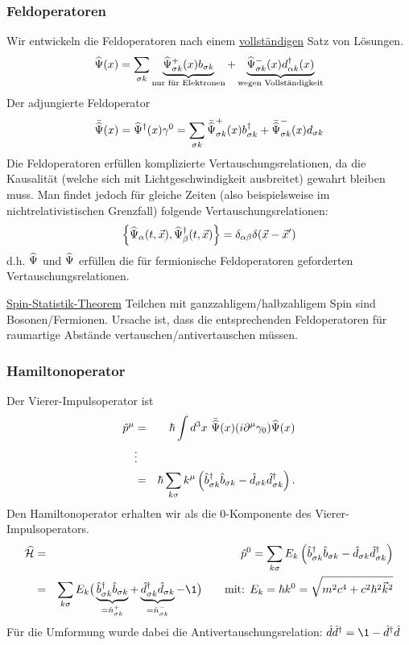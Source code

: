 \subsubsection{Feldoperatoren}
Wir entwickeln die Feldoperatoren nach einem \underline{vollständigen} Satz von Lösungen.
\begin{eqnarray*}
\widehat\Psi(x) = \sum_{\sigma k } \underbrace{\widehat\Psi^+_{\sigma k}(x)b_{\sigma k}}_{\text{nur für Elektronen}} + \underbrace{\widehat\Psi^-_{\sigma k}(x) d_{\alpha k }^\dagger(x) }_{\text{wegen Vollständigkeit}}
\end{eqnarray*}
Der adjungierte Feldoperator
\begin{eqnarray*}
\bar{\widehat\Psi}(x) = \widehat\Psi^\dagger(x) \gamma^0 = \sum_{\sigma k}\bar{\widehat\Psi}^+_{\sigma k}(x) b_{\sigma k}^\dagger + \bar{\widehat\Psi}_{\sigma k}^-(x) d_{\sigma k}
\end{eqnarray*}
Die Feldoperatoren erfüllen komplizierte Vertauschungsrelationen, da die Kausalität (welche sich mit Lichtgeschwindigkeit ausbreitet) gewahrt bleiben muss. Man findet jedoch für gleiche Zeiten (also beispielsweise im nichtrelativistischen Grenzfall) folgende Vertauschungsrelationen: 
\begin{eqnarray*}
\left\{\widehat\Psi_\alpha(t,\vec x), \widehat\Psi_\beta^\dagger(t,\vec x)\right\} = \delta_{\alpha\beta}\delta(\vec x-\vec x')
\end{eqnarray*}
d.h. $\widehat\Psi$ und $\widehat\Psi$ erfüllen die für fermionische Feldoperatoren geforderten Vertauschungsrelationen.

\underline{Spin-Statistik-Theorem} 
Teilchen mit ganzzahligem/halbzahligem Spin sind Bosonen/Fermionen. Ursache ist, dass die entsprechenden Feldoperatoren für raumartige Abstände vertauschen/antivertauschen müssen.

\subsubsection{Hamiltonoperator}
Der Vierer-Impulsoperator ist
\begin{eqnarray*}
\hat p^\mu &=& \hbar \int d^3x \ \bar{\widehat\Psi}(x) (i\partial^\mu \gamma_0) \widehat\Psi(x)\\
&\vdots&\\
&=& \hbar\sum_{ k \sigma} k^\mu \left( \hat b^\dagger_{\sigma k }\hat b_{\sigma k} - \hat d_{\sigma k}\hat d^\dagger _{\sigma k}\right ).
\end{eqnarray*}
Den Hamiltonoperator erhalten wir als die 0-Komponente des Vierer-Impulsoperators. 
\begin{eqnarray*}
\wh\ham &=& \hat p^0 = \sum_{k \sigma} E_{k}\left(\hat b^\dagger_{\sigma k} \hat b_{\sigma k} - \hat d_{\sigma k}\hat d^\dagger _{\sigma k}\ri)
\\
&=& \sum_{k\sigma} E_{k}\big(\underbrace{\hat b^\dagger_{\sigma k }\hat b_{\sigma k}}_{=\hat n^+_{\sigma k}} + \underbrace{\hat d_{\sigma k }^\dagger\hat d_{\sigma k}}_{=\hat n^-_{\sigma k}} -\1 \big) \qquad  \text{mit: } E_k=\hbar k^0=\sqrt{m^2c^4+c^2\hbar^2 \vec{k}^2}
\end{eqnarray*}
Für die Umformung wurde dabei die Antivertauschungsrelation: $\hat d \hat d^\dagger = \1 -\hat d^\dagger\hat d$

